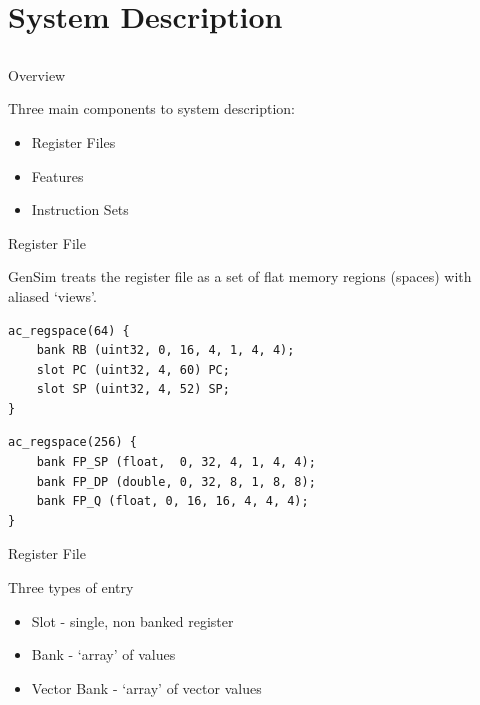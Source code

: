 \section{System Description}
\subsection{}

\begin{frame}{Overview}

Three main components to system description:
\begin{itemize}
\item Register Files
\item Features
\item Instruction Sets
\end{itemize}

\end{frame}

\begin{frame}{Register File}

GenSim treats the register file as a set of flat memory regions (spaces)
with aliased `views'.

\end{frame}

\newsavebox{\codeboxone}
\begin{lrbox}{\codeboxone}
\begin{lstlisting}
ac_regspace(64) {
	bank RB (uint32, 0, 16, 4, 1, 4, 4);
	slot PC (uint32, 4, 60) PC;
	slot SP (uint32, 4, 52) SP;
}
\end{lstlisting}
\end{lrbox}

\newsavebox{\codeboxtwo}
\begin{lrbox}{\codeboxtwo}
\begin{lstlisting}
ac_regspace(256) {
	bank FP_SP (float,  0, 32, 4, 1, 4, 4);
	bank FP_DP (double, 0, 32, 8, 1, 8, 8);
	bank FP_Q (float, 0, 16, 16, 4, 4, 4);
}
\end{lstlisting}
\end{lrbox}

\begin{frame}{Register File}

Three types of entry
\begin{itemize}
\item Slot - single, non banked register
\item Bank - `array' of values
\item Vector Bank - `array' of vector values
\end{itemize}

\end{frame}

